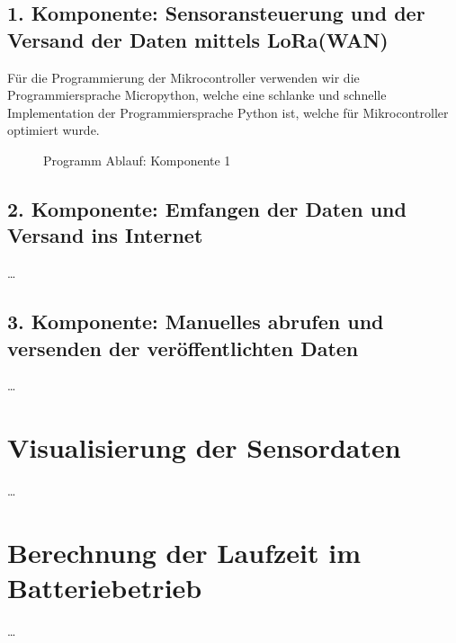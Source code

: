 \subsection{1. Komponente: Sensoransteuerung und der Versand der Daten mittels LoRa(WAN)} \label{Sender}

Für die Programmierung der Mikrocontroller verwenden wir die Programmiersprache Micropython, welche eine schlanke und schnelle Implementation der Programmiersprache Python ist, welche für Mikrocontroller optimiert wurde.

\begin{center}
	\begin{figure}[h]
	 
	 \noindent{}
	 \caption[PAP komponente 1]{Programm Ablauf: Komponente 1}
	 \label{fig:zeitplanung}
	\end{figure}
\end{center}

\subsection{2. Komponente: Emfangen der Daten und Versand ins Internet} \label{Empfänger}

\ldots

\subsection{3. Komponente: Manuelles abrufen und versenden der veröffentlichten Daten} \label{PubSub}

\ldots


\section{Visualisierung der Sensordaten} \label{Dashboard und Visualisierung}

\ldots


\section{Berechnung der Laufzeit im Batteriebetrieb} \label{Simulation}

\ldots
